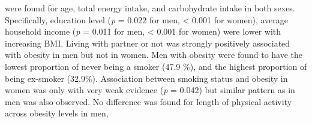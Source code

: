 were found for age, total energy intake, and carbohydrate intake in both sexes. Specifically, education level (\textit{p} = 0.022 for men, < 0.001 for women), average household income (\textit{p} = 0.011 for men, < 0.001 for women) were lower with increasing BMI. Living with partner or not was strongly positively associated with obesity in men but not in women. Men with obesity were found to have the lowest proportion of never being a smoker (47.9 \%), and the highest proportion of being ex-smoker (32.9\%). Association between smoking status and obesity in women was only with very weak evidence (\textit{p} = 0.042) but similar pattern as in men was also observed. No difference was found for length of physical activity across obesity levels in men, 



